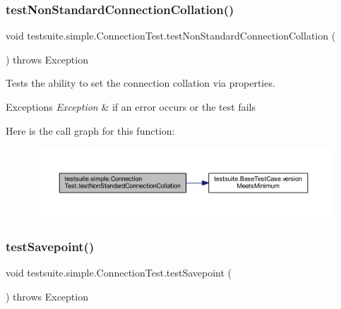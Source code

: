 \subsubsection{\texorpdfstring{test\+Non\+Standard\+Connection\+Collation()}{testNonStandardConnectionCollation()}}
{\footnotesize\ttfamily void testsuite.\+simple.\+Connection\+Test.\+test\+Non\+Standard\+Connection\+Collation (\begin{DoxyParamCaption}{ }\end{DoxyParamCaption}) throws Exception}

Tests the ability to set the connection collation via properties.


\begin{DoxyExceptions}{Exceptions}
{\em Exception} & if an error occurs or the test fails \\
\hline
\end{DoxyExceptions}
Here is the call graph for this function\+:
\nopagebreak
\begin{figure}[H]
\begin{center}
\leavevmode
\includegraphics[width=350pt]{classtestsuite_1_1simple_1_1_connection_test_a8965be404ac9488d5926ecd89eaeb919_cgraph}
\end{center}
\end{figure}
\mbox{\label{classtestsuite_1_1simple_1_1_connection_test_a999284ad25ed2dab4c2caa40dd551b51}} 
\subsubsection{\texorpdfstring{test\+Savepoint()}{testSavepoint()}}
{\footnotesize\ttfamily void testsuite.\+simple.\+Connection\+Test.\+test\+Savepoint (\begin{DoxyParamCaption}{ }\end{DoxyParamCaption}) throws Exception}

